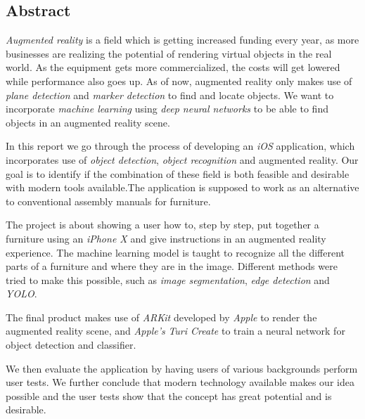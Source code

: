 \begin{center}
\section*{Abstract}
\end{center}
\textit{Augmented reality} is a field which is getting increased funding every year, as more businesses are realizing the potential of rendering virtual objects in the real world. As the equipment gets more commercialized, the costs will get lowered while performance also goes up. As of now, augmented reality only makes use of \textit{plane detection} and \textit{marker detection} to find and locate objects. We want to incorporate \textit{machine learning} using \textit{deep neural networks} to be able to find objects in an augmented reality scene. 

In this report we go through the process of developing an \textit{iOS} application, which incorporates use of \textit{object detection}, \textit{object recognition} and augmented reality. Our goal is to identify if the combination of these field is both feasible and desirable with modern tools available.The application is supposed to work as an alternative to conventional assembly manuals for furniture. 

The project is about showing a user how to, step by step, put together a furniture using an \textit{iPhone X} and give instructions in an augmented reality experience.
The machine learning model is taught to recognize all the different parts of a furniture and where they are in the image. Different methods were tried to make this possible, such as \textit{image segmentation}, \textit{edge detection} and \textit{YOLO}.

The final product makes use of \textit{ARKit} developed by \textit{Apple} to render the augmented reality scene, and \textit{Apple's} \textit{Turi Create} to train a neural network for object detection and classifier. 

We then evaluate the application by having users of various backgrounds perform user tests. We further conclude that modern technology available makes our idea possible and the user tests show that the concept has great potential and is desirable.
\newpage